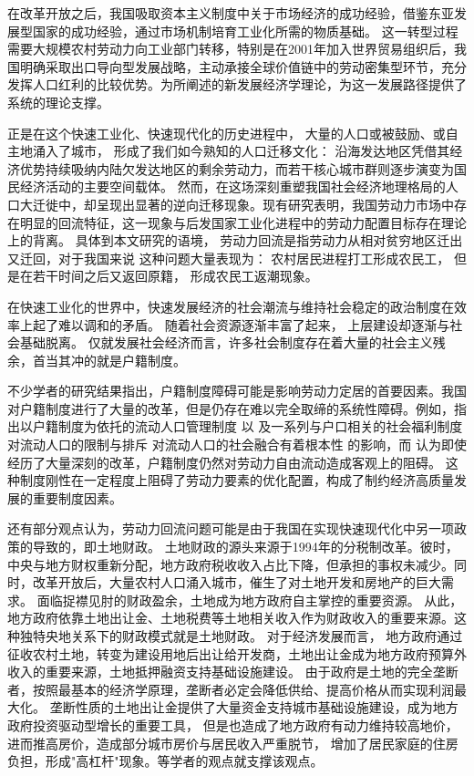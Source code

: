 \documentclass[a4paper, zihao=-4, fontset = mac, oneside]{ctexbook} %
\begin{document}
在改革开放之后，我国吸取资本主义制度中关于市场经济的成功经验，借鉴东亚发展型国家的成功经验，通过市场机制培育工业化所需的物质基础。
这一转型过程需要大规模农村劳动力向工业部门转移，特别是在2001年加入世界贸易组织后，我国明确采取出口导向型发展战略，主动承接全球价值链中的劳动密集型环节，充分发挥人口红利的比较优势。\textcite{LinYiFuZhongGuoDeJingJiFaZhanZhanLueYuDiQuShouRuChaiJu2003}为所阐述的新发展经济学理论，为这一发展路径提供了系统的理论支撑。

正是在这个快速工业化、快速现代化的历史进程中，
大量的人口或被鼓励、或自主地涌入了城市，
形成了我们如今熟知的人口迁移文化：
沿海发达地区凭借其经济优势持续吸纳内陆欠发达地区的剩余劳动力，而若干核心城市群则逐步演变为国民经济活动的主要空间载体。
然而，在这场深刻重塑我国社会经济地理格局的人口大迁徙中，却呈现出显著的逆向迁移现象。现有研究表明，我国劳动力市场中存在明显的回流特征，这一现象与后发国家工业化进程中的劳动力配置目标存在理论上的背离。
具体到本文研究的语境，
劳动力回流是指劳动力从相对贫穷地区迁出又迁回，对于我国来说
这种问题大量表现为：
农村居民进程打工形成农民工，
但是在若干时间之后又返回原籍，
形成农民工返潮现象。

在快速工业化的世界中，快速发展经济的社会潮流与维持社会稳定的政治制度在效率上起了难以调和的矛盾。
随着社会资源逐渐丰富了起来，
上层建设却逐渐与社会基础脱离。
仅就发展社会经济而言，许多社会制度存在着大量的社会主义残余，首当其冲的就是户籍制度。

不少学者的研究结果指出，户籍制度障碍可能是影响劳动力定居的首要因素。我国对户籍制度进行了大量的改革，但是仍存在难以完全取缔的系统性障碍。例如，\textcite{RenYuanChengShiLiuDongRenKouDeSheHuiRongHeWenXianShuPing2006}指出以户籍制度为依托的流动人口管理制度 以 及一系列与户口相关的社会福利制度对流动人口的限制与排斥 对流动人口的社会融合有着根本性 的影响，而
\textcite{LuYiLongHuKouHuanQiZuoYongMaHuJiZhiDuYuSheHuiFenCengHeLiuDong2008}认为即使经历了大量深刻的改革，户籍制度仍然对劳动力自由流动造成客观上的阻碍。
这种制度刚性在一定程度上阻碍了劳动力要素的优化配置，构成了制约经济高质量发展的重要制度因素。

还有部分观点认为，劳动力回流问题可能是由于我国在实现快速现代化中另一项政策的导致的，即土地财政。
土地财政的源头来源于1994年的分税制改革。彼时，中央与地方财权重新分配，地方政府税收收入占比下降，但承担的事权未减少。同时，改革开放后，大量农村人口涌入城市，催生了对土地开发和房地产的巨大需求。
面临捉襟见肘的财政盈余，土地成为地方政府自主掌控的重要资源。
从此，地方政府依靠土地出让金、土地税费等土地相关收入作为财政收入的重要来源。这种独特央地关系下的财政模式就是土地财政。
对于经济发展而言，
地方政府通过征收农村土地，转变为建设用地后出让给开发商，土地出让金成为地方政府预算外收入的重要来源，土地抵押融资支持基础设施建设。
由于政府是土地的完全垄断者，按照最基本的经济学原理，垄断者必定会降低供给、提高价格从而实现利润最大化。
垄断性质的土地出让金提供了大量资金支持城市基础设施建设，成为地方政府投资驱动型增长的重要工具，
但是也造成了地方政府有动力维持较高地价，进而推高房价，造成部分城市房价与居民收入严重脱节，
增加了居民家庭的住房负担，形成"高杠杆"现象。\textcite{ChenYingFangNongMinGongZhiDuAnPaiYuShenFenRenTong2005,niehuihuaZhongguogaofangjiadexinzhengzhijingjixuejieshiYiZhengqihemou2013,YuJianXingDiFangFaZhanXingZhengFuDeXingWeiLuoJiJiZhiDuJiChu2012}等学者的观点就支撑该观点。
\end{document}
